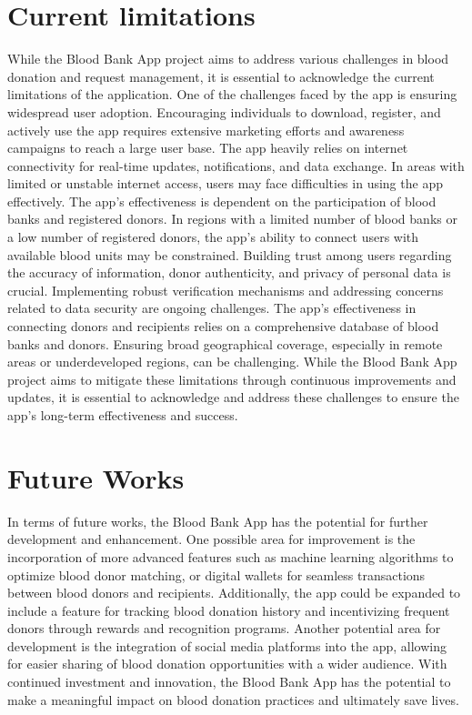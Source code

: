 \documentclass{article}
\begin{document}
\section{Current limitations}
While the Blood Bank App project aims to address various challenges in blood donation and
request management, it is essential to acknowledge the current limitations of the application.
One of the challenges faced by the app is ensuring widespread user adoption. Encouraging
individuals to download, register, and actively use the app requires extensive marketing efforts
and awareness campaigns to reach a large user base. The app heavily relies on internet
connectivity for real-time updates, notifications, and data exchange. In areas with limited or
unstable internet access, users may face difficulties in using the app effectively. The app's
effectiveness is dependent on the participation of blood banks and registered donors. In regions
with a limited number of blood banks or a low number of registered donors, the app's ability to
connect users with available blood units may be constrained. Building trust among users
regarding the accuracy of information, donor authenticity, and privacy of personal data is crucial.
Implementing robust verification mechanisms and addressing concerns related to data security
are ongoing challenges. The app's effectiveness in connecting donors and recipients relies on a
comprehensive database of blood banks and donors. Ensuring broad geographical coverage,
especially in remote areas or underdeveloped regions, can be challenging. While the Blood Bank
App project aims to mitigate these limitations through continuous improvements and updates, it
is essential to acknowledge and address these challenges to ensure the app's long-term
effectiveness and success.
\section{Future Works}
In terms of future works, the Blood Bank App has the potential for further development and
enhancement. One possible area for improvement is the incorporation of more advanced
features such as machine learning algorithms to optimize blood donor matching, or digital wallets
for seamless transactions between blood donors and recipients. Additionally, the app could be
expanded to include a feature for tracking blood donation history and incentivizing frequent
donors through rewards and recognition programs. Another potential area for development is
the integration of social media platforms into the app, allowing for easier sharing of blood
donation opportunities with a wider audience. With continued investment and innovation, the
Blood Bank App has the potential to make a meaningful impact on blood donation practices and
ultimately save lives.
\end{document}
